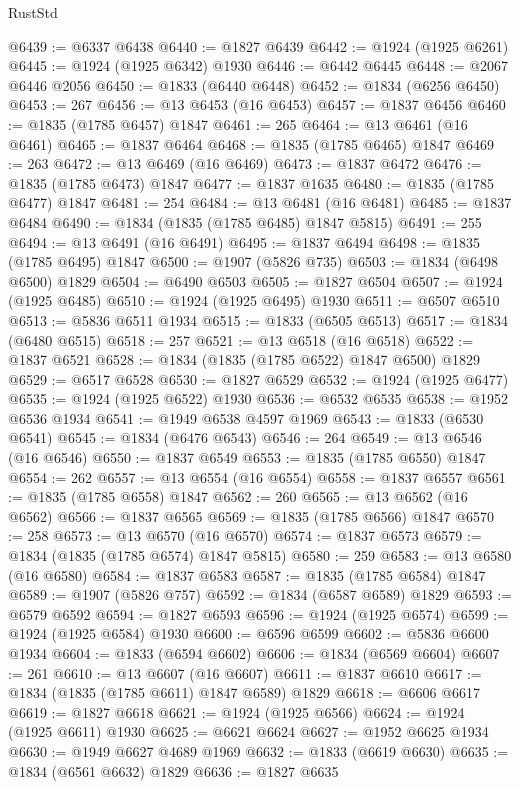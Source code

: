 \begin{lexlean}{RustStd}
\begin{coremodule}
{\begin{coremodule}
{{{{{@6439 := @6337 @6438
@6440 := @1827 @6439
@6442 := @1924 (@1925 @6261)
@6445 := @1924 (@1925 @6342) @1930
@6446 := @6442 @6445
@6448 := @2067 @6446 @2056
@6450 := @1833 (@6440 @6448)
@6452 := @1834 (@6256 @6450)
@6453 := 267
@6456 := @13 @6453 (@16 @6453)
@6457 := @1837 @6456
@6460 := @1835 (@1785 @6457) @1847
@6461 := 265
@6464 := @13 @6461 (@16 @6461)
@6465 := @1837 @6464
@6468 := @1835 (@1785 @6465) @1847
@6469 := 263
@6472 := @13 @6469 (@16 @6469)
@6473 := @1837 @6472
@6476 := @1835 (@1785 @6473) @1847
@6477 := @1837 @1635
@6480 := @1835 (@1785 @6477) @1847
@6481 := 254
@6484 := @13 @6481 (@16 @6481)
@6485 := @1837 @6484
@6490 := @1834 (@1835 (@1785 @6485) @1847 @5815)
@6491 := 255
@6494 := @13 @6491 (@16 @6491)
@6495 := @1837 @6494
@6498 := @1835 (@1785 @6495) @1847
@6500 := @1907 (@5826 @735)
@6503 := @1834 (@6498 @6500) @1829
@6504 := @6490 @6503
@6505 := @1827 @6504
@6507 := @1924 (@1925 @6485)
@6510 := @1924 (@1925 @6495) @1930
@6511 := @6507 @6510
@6513 := @5836 @6511 @1934
@6515 := @1833 (@6505 @6513)
@6517 := @1834 (@6480 @6515)
@6518 := 257
@6521 := @13 @6518 (@16 @6518)
@6522 := @1837 @6521
@6528 := @1834 (@1835 (@1785 @6522) @1847 @6500) @1829
@6529 := @6517 @6528
@6530 := @1827 @6529
@6532 := @1924 (@1925 @6477)
@6535 := @1924 (@1925 @6522) @1930
@6536 := @6532 @6535
@6538 := @1952 @6536 @1934
@6541 := @1949 @6538 @4597 @1969
@6543 := @1833 (@6530 @6541)
@6545 := @1834 (@6476 @6543)
@6546 := 264
@6549 := @13 @6546 (@16 @6546)
@6550 := @1837 @6549
@6553 := @1835 (@1785 @6550) @1847
@6554 := 262
@6557 := @13 @6554 (@16 @6554)
@6558 := @1837 @6557
@6561 := @1835 (@1785 @6558) @1847
@6562 := 260
@6565 := @13 @6562 (@16 @6562)
@6566 := @1837 @6565
@6569 := @1835 (@1785 @6566) @1847
@6570 := 258
@6573 := @13 @6570 (@16 @6570)
@6574 := @1837 @6573
@6579 := @1834 (@1835 (@1785 @6574) @1847 @5815)
@6580 := 259
@6583 := @13 @6580 (@16 @6580)
@6584 := @1837 @6583
@6587 := @1835 (@1785 @6584) @1847
@6589 := @1907 (@5826 @757)
@6592 := @1834 (@6587 @6589) @1829
@6593 := @6579 @6592
@6594 := @1827 @6593
@6596 := @1924 (@1925 @6574)
@6599 := @1924 (@1925 @6584) @1930
@6600 := @6596 @6599
@6602 := @5836 @6600 @1934
@6604 := @1833 (@6594 @6602)
@6606 := @1834 (@6569 @6604)
@6607 := 261
@6610 := @13 @6607 (@16 @6607)
@6611 := @1837 @6610
@6617 := @1834 (@1835 (@1785 @6611) @1847 @6589) @1829
@6618 := @6606 @6617
@6619 := @1827 @6618
@6621 := @1924 (@1925 @6566)
@6624 := @1924 (@1925 @6611) @1930
@6625 := @6621 @6624
@6627 := @1952 @6625 @1934
@6630 := @1949 @6627 @4689 @1969
@6632 := @1833 (@6619 @6630)
@6635 := @1834 (@6561 @6632) @1829
@6636 := @1827 @6635
}}}}}
\end{coremodule}}
\end{coremodule}
\end{lexlean}
